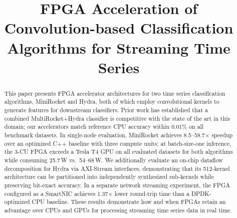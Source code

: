\documentclass[conference]{IEEEtran}
\begin{document}
\newcommand{\eg}{\emph{e.g.,} }
\newcommand{\ie}{\emph{i.e.,} }

\newcommand{\pb}[1]{\textcolor{blue}{[PB:~#1]}}
\newcommand{\py}[1]{\textcolor{orange}{[PY:~#1]}}
\newcommand{\todo}[1]{\textcolor{purple}{[Todo:~#1]}}



\title{FPGA Acceleration of Convolution-based Classification Algorithms for Streaming Time Series}


\maketitle

\begin{abstract}
This paper presents FPGA accelerator architectures for two time series classification algorithms, MiniRocket and Hydra, both of which employ convolutional kernels to generate features for downstream classifiers. Prior work has established that a combined MultiRocket+Hydra classifier is competitive with the state of the art in this domain; our accelerators match reference CPU accuracy within 0.01\% on all benchmark datasets. In single-node evaluation, MiniRocket achieves 8.5--58.7$\times$ speedup over an optimized C++ baseline with three compute units; at batch-size-one inference, the 3-CU FPGA exceeds a Tesla T4 GPU on all evaluated datasets for both algorithms while consuming 25.7\,W vs.\ 54--68\,W. We additionally evaluate an on-chip dataflow decomposition for Hydra via AXI-Stream interfaces, demonstrating that its 512-kernel architecture can be partitioned into independently synthesized sub-kernels while preserving bit-exact accuracy. In a separate network streaming experiment, the FPGA configured as a SmartNIC achieves 1.37$\times$ lower round-trip time than a DPDK-optimized CPU baseline. These results demonstrate how and when FPGAs retain an advantage over CPUs and GPUs for processing streaming time series data in real time.
\end{abstract}











{\small


}
\end{document}
